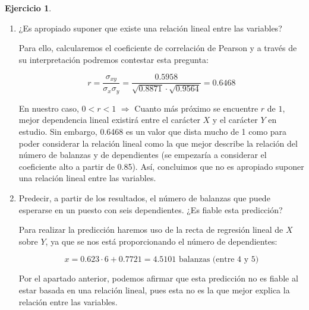 \documentclass[a4paper, 12pt]{article}
\theoremstyle{definition}
\newtheorem{ej}{Ejercicio}
\begin{document}
\begin{ej}
\begin{enumerate}[label=\alph*)]
\item ¿Es apropiado suponer que existe una relación lineal entre las variables?

Para ello, calcularemos el coeficiente de correlación de Pearson y a través de su interpretación podremos contestar esta pregunta:

\[
    r = \frac{\sigma_{xy}}{\sigma_x \sigma_y} = \frac{0.5958}{\sqrt{0.8871}\cdot\sqrt{0.9564}} = 0.6468
\]

En nuestro caso, $0 < r < 1$ $\Rightarrow$ Cuanto más próximo se encuentre $r$ de $1$, mejor dependencia lineal existirá entre el carácter $X$ y el carácter $Y$ en estudio. Sin embargo, 0.6468 es un valor que dista mucho de 1 como para poder considerar la relación lineal como la que mejor describe la relación del número de balanzas y de dependientes (se empezaría a considerar el coeficiente alto a partir de 0.85). Así, concluimos que no es apropiado suponer una relación lineal entre las variables.

\item Predecir, a partir de los resultados, el número de balanzas que puede esperarse en un puesto
con seis dependientes. ¿Es fiable esta predicción?

Para realizar la predicción haremos uso de la recta de regresión lineal de $X$ sobre $Y$, ya que se nos está proporcionando el número de dependientes:

\[
    x = 0.623 \cdot 6 + 0.7721 = 4.5101 \text{ balanzas (entre 4 y 5)}
\]

Por el apartado anterior, podemos afirmar que esta predicción no es fiable al estar basada en una relación lineal, pues esta no es la que mejor explica la relación entre las variables.
\end{enumerate}
\end{ej}
\end{document}
